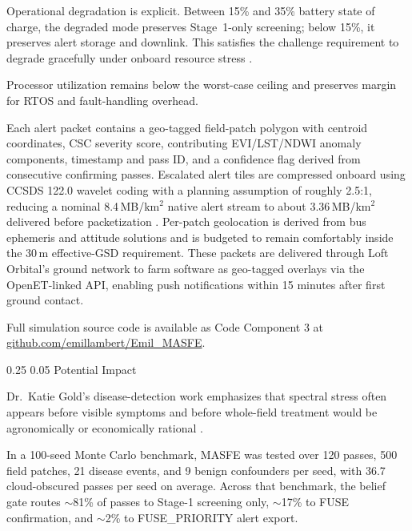 \documentclass[11pt,letterpaper]{article}
\makeatletter
\renewcommand\section{\@startsection{section}{1}{\z@}
  {0.25\baselineskip}
  {0.05\baselineskip}
  {\normalfont\large\bfseries}}
\newcommand{\masferepo}{https://github.com/emillambert/Emil_MASFE}
\makeatother
\begin{document}
Operational degradation is explicit. Between 15\% and 35\% battery state of charge, the degraded mode preserves Stage~1-only screening; below 15\%, it preserves alert storage and downlink. This satisfies the challenge requirement to degrade gracefully under onboard resource stress \cite{nasa-challenge-brief}.

Processor utilization remains below the worst-case ceiling and preserves margin for RTOS and fault-handling overhead.

Each alert packet contains a geo-tagged field-patch polygon with centroid coordinates, CSC severity score, contributing EVI/LST/NDWI anomaly components, timestamp and pass ID, and a confidence flag derived from consecutive confirming passes. Escalated alert tiles are compressed onboard using CCSDS 122.0 wavelet coding with a planning assumption of roughly 2.5:1, reducing a nominal 8.4\,MB/km$^2$ native alert stream to about 3.36\,MB/km$^2$ delivered before packetization \cite{esa-cwicom}. Per-patch geolocation is derived from bus ephemeris and attitude solutions and is budgeted to remain comfortably inside the 30\,m effective-GSD requirement. These packets are delivered through Loft Orbital's ground network to farm software as geo-tagged overlays via the OpenET-linked API, enabling push notifications within 15 minutes after first ground contact.

Full simulation source code is available as Code Component 3 at \href{\masferepo}{github.com/emillambert/Emil\_MASFE}.

\section{Potential Impact}
\label{sec:impact}

Dr.\ Katie Gold's disease-detection work emphasizes that spectral stress often appears before visible symptoms and before whole-field treatment would be agronomically or economically rational \cite{gold-webinar1}.

In a 100-seed Monte Carlo benchmark, MASFE was tested over 120 passes, 500 field patches, 21 disease events, and 9 benign confounders per seed, with 36.7 cloud-obscured passes per seed on average. Across that benchmark, the belief gate routes $\sim$81\% of passes to Stage-1 screening only, $\sim$17\% to FUSE confirmation, and $\sim$2\% to FUSE\_PRIORITY alert export.
\end{document}
